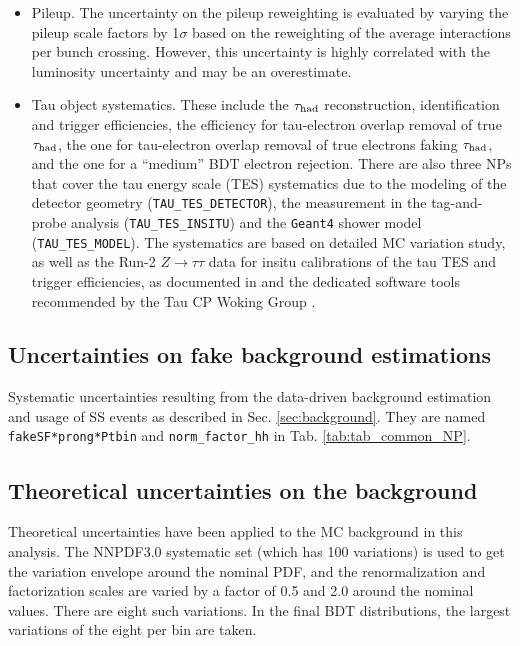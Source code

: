 \begin{itemize}
\item Pileup. The uncertainty on the pileup reweighting is evaluated by varying the pileup scale factors by 1$\sigma$ based on the reweighting of the average interactions per bunch crossing. However, this uncertainty is highly correlated with the luminosity uncertainty and may be an overestimate.
\item Tau object systematics. These include the $\tau_\text{had}$ reconstruction, identification and trigger efficiencies, the efficiency for tau-electron overlap removal of true $\tau_\text{had}$, the one for tau-electron overlap removal of true electrons faking $\tau_\text{had}$, and the one for a ``medium'' BDT electron rejection. There are also three NPs that cover the tau energy scale (TES) systematics due to the modeling of the detector geometry (\texttt{TAU\_TES\_DETECTOR}), the measurement in the tag-and-probe analysis (\texttt{TAU\_TES\_INSITU}) and the \texttt{Geant4} shower model (\texttt{TAU\_TES\_MODEL}). The systematics are based on detailed MC variation study, as well as the Run-2 $Z\to\tau\tau$ data for insitu calibrations of the tau TES and trigger efficiencies, as documented in \cite{tau_sys1} and the dedicated software tools \cite{tau_sys2} recommended by the Tau CP Woking Group \cite{TauCP}.
\end{itemize}

\subsection{Uncertainties on fake background estimations}
\label{sec:syst_datadriven}

Systematic uncertainties resulting from the data-driven background estimation and usage of SS events as described in Sec. \ref{sec:background}. They are named \texttt{fakeSF*prong*Ptbin} and \texttt{norm\_factor\_hh} in Tab. \ref{tab:tab_common_NP}.

\subsection{Theoretical uncertainties on the background}

Theoretical uncertainties have been applied to the MC background in this analysis. The NNPDF3.0 systematic set (which has 100 variations) is used to get the variation envelope around the nominal PDF, and the renormalization and factorization scales are varied by a factor of 0.5 and 2.0 around the nominal values. There are eight such variations. In the final BDT distributions, the largest variations of the eight per bin are taken.

